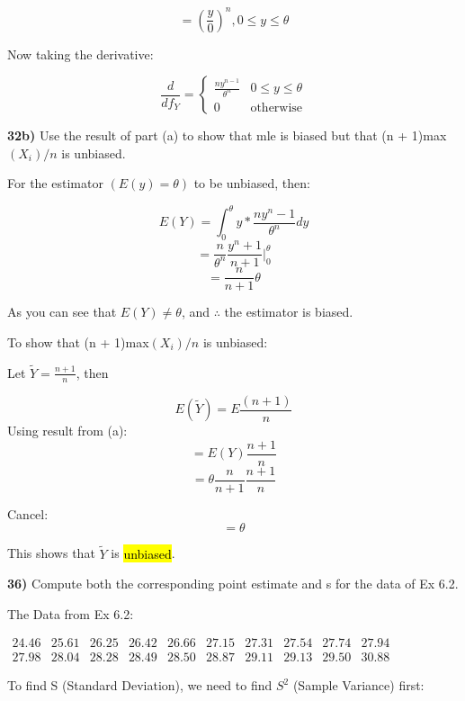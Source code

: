 \documentclass{article}
\begin{document}
$$=(\frac{y}{0})^{n},  0\le y \le \theta$$

Now taking the derivative:

$$\frac{d}{df_{Y}}=
\begin{cases}
 \frac{ny^{n-1}}{\theta^{n}} & 0\le y \le \theta \\
 0 & \text{otherwise} 
\end{cases}$$ 




\newpage

\textbf{32b)} Use the result of part (a) to show that mle is biased but that (n + 1)max$(X_{i})/n$ is unbiased.

For the estimator $(E(y)=\theta)$ to be unbiased, then: 

$$E(Y)=\int_{0}^{\theta} y * \frac{ny^n-1}{\theta^n} dy$$
$$=\frac{n}{\theta^n}\frac{y^n+1}{n+1}|_{0}^{\theta}$$
$$=\frac{n}{n+1}\theta$$

As you can see that $E(Y) \neq \theta$, and $\therefore$ the estimator is biased.

\vspace{3mm}

To show that (n + 1)max$(X_{i})/n$ is unbiased:

Let $\tilde{Y}=\frac{n+1}{n}$, then

$$E(\tilde{Y})=E\frac{(n+1)}{n}$$
Using result from (a):
$$=E(Y)\frac{n+1}{n}$$
$$=\theta \frac{n}{n+1}\frac{n+1}{n}$$

Cancel:
$$=\theta$$

This shows that $\tilde{Y}$ is \hl{unbiased}.





\newpage

\textbf{36)} Compute both the corresponding point estimate and s for the data of Ex 6.2.

The Data from Ex 6.2:

\vspace{3mm}

$\begin{matrix}
24.46 & 25.61 & 26.25 & 26.42 & 26.66  & 27.15 & 27.31 & 27.54 & 27.74 & 27.94 \\
27.98 & 28.04 & 28.28 & 28.49 & 28.50 & 28.87 & 29.11 & 29.13 & 29.50 & 30.88
\end{matrix}$

\vspace{2mm}

To find S (Standard Deviation), we need to find $S^{2}$ (Sample Variance) first:
\end{document}
